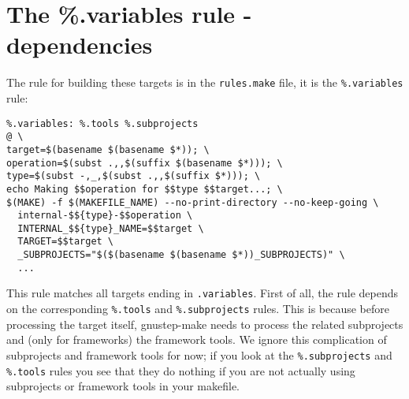 \documentclass[a4paper]{article}
\begin{document}
\section{The \%.variables rule - dependencies}
The rule for building these targets is in the \texttt{rules.make} file, 
it is the \texttt{\%.variables} rule:
\begin{verbatim}
%.variables: %.tools %.subprojects
@ \
target=$(basename $(basename $*)); \
operation=$(subst .,,$(suffix $(basename $*))); \
type=$(subst -,_,$(subst .,,$(suffix $*))); \
echo Making $$operation for $$type $$target...; \
$(MAKE) -f $(MAKEFILE_NAME) --no-print-directory --no-keep-going \
  internal-$${type}-$$operation \
  INTERNAL_$${type}_NAME=$$target \
  TARGET=$$target \
  _SUBPROJECTS="$($(basename $(basename $*))_SUBPROJECTS)" \
  ...
\end{verbatim}%
This rule matches all targets ending in \texttt{.variables}.  First of
all, the rule depends on the corresponding \texttt{\%.tools} and
\texttt{\%.subprojects} rules.  This is because before processing the
target itself, gnustep-make needs to process the related subprojects
and (only for frameworks) the framework tools.  We ignore this
complication of subprojects and framework tools for now; if you look
at the \texttt{\%.subprojects} and \texttt{\%.tools} rules you see
that they do nothing if you are not actually using subprojects or
framework tools in your makefile.
\end{document}
